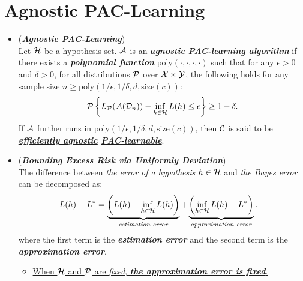 \documentclass[11pt]{article}
\begin{document}
\section{Agnostic PAC-Learning}
\begin{itemize}
\item \begin{definition} (\emph{\textbf{Agnostic PAC-Learning}})\\
Let ${\mathcal H}$ be a hypothesis set. ${\mathcal A}$ is an \underline{\emph{\textbf{agnostic PAC-learning algorithm}}} if there
exists a \emph{\textbf{polynomial function}} $\text{poly}(\cdot, \cdot, \cdot, \cdot)$  such that for any $\epsilon > 0$ and $\delta > 0$,
for all distributions ${\mathcal P}$ over ${\mathcal X} \times {\mathcal Y}$, the following holds for any sample size $n \ge \text{poly}(1/\epsilon, 1/\delta, d, \text{size}(c))$:
\begin{align}
{\mathcal P}\left\{L_{{\mathcal P}}({\mathcal A}({\mathcal D}_n)) - \inf_{h \in {\mathcal H}}L(h)  \le \epsilon \right\} \ge 1 - \delta. \label{eqn: agnostic_pac_definition}
\end{align} If ${\mathcal A}$ further runs in $\text{poly}(1/\epsilon, 1/\delta, d, \text{size}(c))$, then ${\mathcal C}$ is said to be \emph{\textbf{\underline{efficiently agnostic} \underline{PAC-learnable}}}. 
\end{definition}


\item \begin{remark} (\emph{\textbf{Bounding Excess Risk via Uniformly Deviation}})\\
The difference between \emph{the error of a hypothesis} $h \in {\mathcal H}$ and \emph{the Bayes error} can be decomposed as:
\begin{align*}
L(h) - L^{*} &=\underbrace{\left(L(h) - \inf_{h \in {\mathcal H}}L(h)\right)}_{\text{\emph{estimation error}}} + \underbrace{\left(\inf_{h \in {\mathcal H}}L(h) - L^{*}\right)}_{\text{\emph{approximation error}}}.
\end{align*} 
where the first term is the \emph{\textbf{estimation error}} and the second term is the \emph{\textbf{approximation error}}.
\begin{itemize}
\item  \underline{When ${\mathcal H}$ and ${\mathcal P}$ are \emph{fixed}, \emph{\textbf{the approximation error is fixed}}.} 


\end{itemize}
\end{remark}
\end{itemize}
\end{document}

